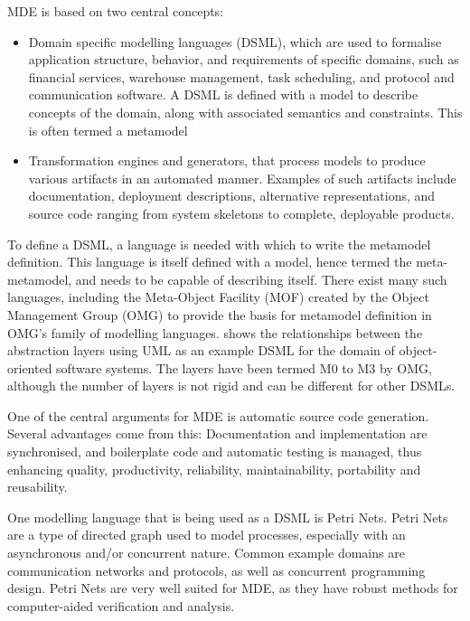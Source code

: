MDE is based on two central concepts:
\begin{itemize}
	\item Domain specific modelling languages (DSML), which are used to formalise
	application structure, behavior, and requirements of specific domains, such as
	financial services, warehouse management, task scheduling, and protocol and
	communication software. A DSML is defined with a model to describe concepts
	of the domain, along with associated semantics and constraints. This is often
	termed a metamodel
	\item Transformation engines and generators, that process models to produce
	various artifacts in an automated manner. Examples of such
	artifacts include documentation, deployment descriptions, alternative
	representations, and source code ranging from system skeletons to complete,
	deployable products.
\end{itemize}

To define a DSML, a language is needed with which to write the
metamodel definition. This language is itself defined with a model, hence termed
the meta-metamodel, and needs to be capable of describing itself. There exist many such
languages, including the Meta-Object Facility (MOF) \cite{mof} created by the
Object Management Group (OMG) to provide the basis for metamodel definition in
OMG’s family of modelling languages. 
shows the relationships between the abstraction layers using UML as an example
DSML for the domain of object-oriented software systems. The layers have
been termed M0 to M3 by OMG, although the number of layers is not rigid and can
be different for other DSMLs. 


One of the central arguments for MDE is automatic source code generation.
Several advantages come from this:  Documentation and
implementation are synchronised, and boilerplate code and automatic testing is
managed, thus enhancing quality, productivity, reliability, maintainability,
portability and reusability.

One modelling language that is being used as a DSML is Petri Nets. 
Petri Nets are a type of directed graph used to model processes,
especially with an asynchronous and/or concurrent nature. Common
example domains are communication networks and protocols, as
well as concurrent programming design.
Petri Nets are very well suited for MDE, as they have robust methods for
computer-aided verification and analysis. 

